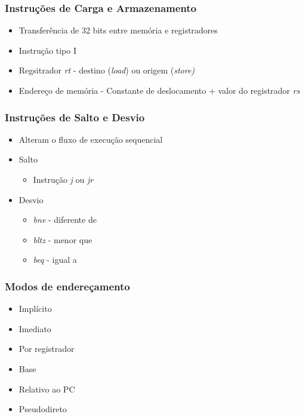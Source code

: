 \documentclass[aspectratio=169,
				xcolor=table]{beamer}
\begin{document}
	\begin{frame}
		\frametitle{Instruções de Carga e Armazenamento }
		\begin{itemize}
			\item Transferência de 32 bits entre memória e registradores
			\vspace{1em}
			\item Instrução tipo I
			\vspace{1em}
			\item Regsitrador \textit{rt} - destino (\textit{load}) ou origem (\textit{store)}
			\vspace{1em}
			\item Endereço de memória - Constante de deslocamento + valor do registrador \textit{rs}
		\end{itemize}
	\end{frame}
	
	\begin{frame}
		\frametitle{Instruções de Salto e Desvio}
		\begin{itemize}
			\item Alteram o fluxo de execução sequencial
			\vspace{1em}
			\item Salto
			\begin{itemize}
				\item Instrução \textit{j} ou \textit{jr}
			\end{itemize}
			\vspace{1em}
			\item Desvio
			\begin{itemize}
				\item \textit{bne} - diferente de
				\item \textit{bltz} - menor que
				\item \textit{beq} - igual a
			\end{itemize}
		\end{itemize}
	\end{frame}
	
	\begin{frame}
		\frametitle{Modos de endereçamento}
		\begin{itemize}
			\item Implícito
			\item Imediato
			\item Por registrador
			\item Base
			\item Relativo ao PC
			\item Pseudodireto
		\end{itemize}
	\end{frame}
	
\end{document}
